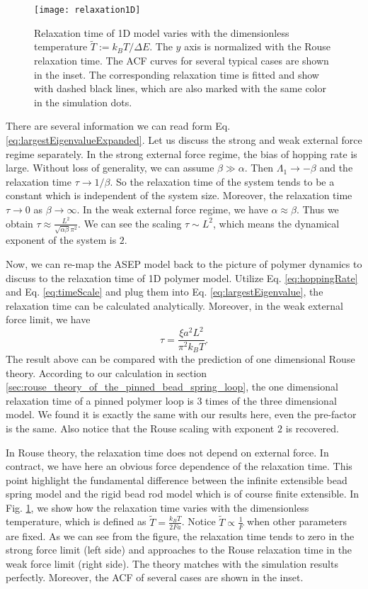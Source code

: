 \begin{figure}[htpb]
    \centering
    \texttt{[image: relaxation1D]}
    \caption{Relaxation time of 1D model varies with the dimensionless temperature $\tilde{T}:=k_B T/\Delta E$. The $y$ axis is normalized with the Rouse relaxation time. The ACF curves for several typical cases are shown in the inset. The corresponding relaxation time is fitted and show with dashed black lines, which are also marked with the same color in the simulation dots. }
    \label{fig:relaxation1D}
\end{figure}
There are several information we can read form Eq.  \eqref{eq:largestEigenvalueExpanded}. Let us discuss the strong and weak external force regime separately. 
In the strong external force regime, the bias of hopping rate is large. Without loss of generality, we can assume $\beta \gg \alpha$. Then $\Lambda_1 \rightarrow -\beta$ and the relaxation time $\tau \rightarrow 1/\beta$. So the relaxation time of the system tends to be a constant which is independent of the system size. Moreover, the relaxation time $\tau\rightarrow 0 $ as $\beta\rightarrow\infty$.
In the weak external force regime, we have $\alpha \approx \beta$. Thus we obtain $\tau \approx \frac{L^2}{\sqrt{\alpha\beta}\pi^2}$. We can see the scaling $\tau \sim L^2$, which means the dynamical exponent of the system is $2$. 

Now, we can re-map the ASEP model back to the picture of polymer dynamics to discuss to the relaxation time of 1D polymer model. Utilize Eq. \eqref{eq:hoppingRate} and Eq. \eqref{eq:timeScale} and plug them into Eq. \eqref{eq:largestEigenvalue}, the relaxation time can be calculated analytically. Moreover, in the weak external force limit, we have
\begin{equation}
    \label{eq:relaxationTime1DnoForce}
    \tau = \frac{\xi a^2 L^2}{\pi^2 k_B T}.
\end{equation}
The result above can be compared with the prediction of one dimensional Rouse theory. According to our calculation in section \ref{sec:rouse_theory_of_the_pinned_bead_spring_loop}, the one dimensional relaxation time of a pinned polymer loop is $3$ times of the three dimensional model. We found it is exactly the same with our results here, even the pre-factor is the same. Also notice that the Rouse scaling with exponent $2$ is recovered. 

In Rouse theory, the relaxation time does not depend on external force. In contract, we have here an obvious force dependence of the relaxation time. This point highlight the fundamental difference between the infinite extensible bead spring model and the rigid bead rod model which is of course finite extensible. 
In Fig. \ref{fig:relaxation1D}, we show how the relaxation time varies with the dimensionless temperature, which is defined as $\tilde{T} = \frac{k_B T}{2Fa}$. Notice $\tilde{T} \propto \frac{1}{F}$ when other parameters are fixed. As we can see from the figure, the relaxation time tends to zero in the strong force limit (left side) and approaches to the Rouse relaxation time in the weak force limit (right side). The theory matches with the simulation results perfectly. Moreover, the ACF of several cases are shown in the inset. 



